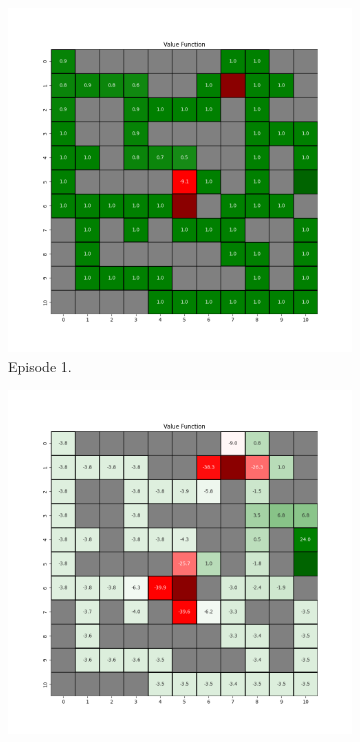 \documentclass{assignment}
\begin{document}
\begin{figure}[H]
    \begin{subfigure}{0.3\textwidth}
        \includegraphics[width=\textwidth]{figures/value_td/gamma_sweep/value_function_alpha_0.1_gamma_0.75_epsilon_0.2_iteration_1.png}
    \caption{Episode 1.}
    \end{subfigure}\hfill
    \begin{subfigure}{0.3\textwidth}
        \includegraphics[width=\textwidth]{figures/value_td/gamma_sweep/value_function_alpha_0.1_gamma_0.75_epsilon_0.2_iteration_50.png}

\end{subfigure}
\end{figure}
\end{document}
